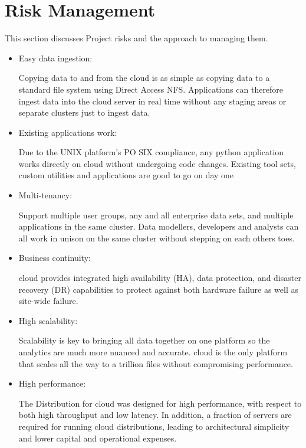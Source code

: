 \documentclass[oneside,a4paper,12pt]{book}
\begin{document}
\section{Risk Management}
This section discusses Project risks and the approach to managing them.
\begin{itemize}
    \item Easy data ingestion:
    \par  Copying data to and from the cloud  is as simple as copying data to a standard file system using Direct Access NFS. Applications can therefore ingest data into the cloud server in real time without any staging areas or separate clusters just to ingest data.
    \item Existing applications work: 
    \par Due to the UNIX platform's PO SIX compliance, any python application works directly on cloud without undergoing code changes. Existing tool sets, custom utilities and applications are good to go on day one
    \item Multi-tenancy:
    \par Support multiple user groups, any and all enterprise data sets, and multiple applications in the same cluster. Data modellers, developers and analysts can all work in unison on the same cluster without stepping on each others toes.
    \item Business continuity:
    \par  cloud provides integrated high availability (HA), data protection, and disaster recovery (DR) capabilities to protect against both hardware failure as well as site-wide failure.
    \item High scalability:
    \par  Scalability is key to bringing all data together on one platform so the analytics are much more nuanced and accurate. cloud is the only platform that scales all the way to a trillion files without compromising performance.
    \item High performance:
    \par  The Distribution for cloud was designed for high performance, with respect to both high throughput and low latency. In addition, a fraction of servers are required for running cloud distributions, leading to architectural simplicity and lower capital and operational expenses.
\end{itemize}
\end{document}
